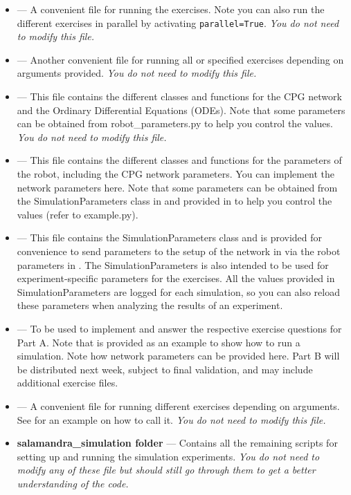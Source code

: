 \documentclass{cmc}
\begin{document}
\begin{itemize}
\item {} --- A convenient file for running the exercises. Note you can also run the different exercises in parallel by
  activating \texttt{parallel=True}. \textit{You do not need to modify this
    file.}
\item {} --- Another convenient file for running all
  or specified exercises depending on arguments provided. \textit{You do not
    need to modify this file.}
\item {} --- This file contains the different classes and
  functions for the CPG network and the Ordinary Differential Equations
  (ODEs). Note that some parameters can be obtained from robot\_parameters.py to help you control
  the values. \textit{You do not need to modify this file.}
\item {} --- This file contains the different
  classes and functions for the parameters of the robot, including the CPG
  network parameters. You can implement the network parameters here. Note that
  some parameters can be obtained from the SimulationParameters class in
   and provided in  to
  help you control the values (refer to example.py).
\item {} --- This file contains the
  SimulationParameters class and is provided for convenience to send parameters
  to the setup of the network in  via the
  robot parameters in . The
  SimulationParameters is also intended to be used for experiment-specific
  parameters for the exercises. All the values provided in SimulationParameters
  are logged for each simulation, so you can also reload these parameters when
  analyzing the results of an experiment.
\item {} --- To be used to implement and answer the
  respective exercise questions for Part A. Note that  is
  provided as an example to show how to run a simulation. Note how network
  parameters can be provided here. Part B will be distributed next week, subject to final validation, and may include additional exercise files.
\item {} --- A convenient file for running different
  exercises depending on arguments. See  for an example
  on how to call it. \textit{You do not need to modify this file.}
\item \textbf{salamandra\_simulation folder} --- Contains all the remaining
  scripts for setting up and running the simulation experiments. \textit{You do
    not need to modify any of these file but should still go through them to get
    a better understanding of the code.}

\end{itemize}
\end{document}
